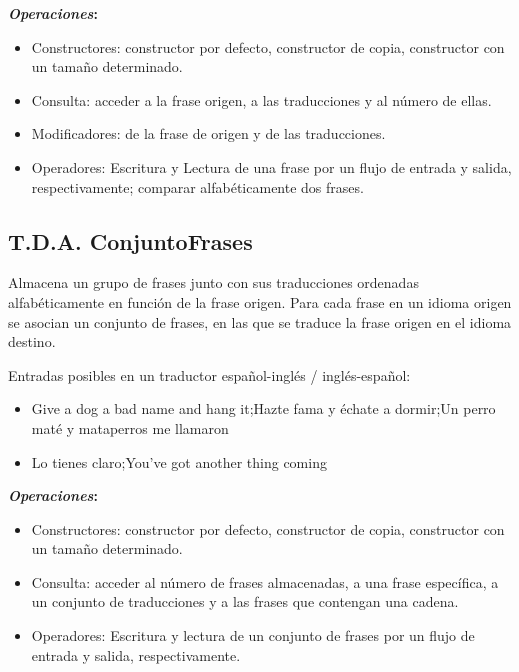 \textbf{\textit{Operaciones}:}
\begin{itemize}
	\item Constructores: constructor por defecto, constructor de copia, constructor con un tamaño determinado.
	\item Consulta: acceder a la frase origen, a las traducciones y al número de ellas.
	\item Modificadores: de la frase de origen y de las traducciones.	
	\item Operadores: Escritura y Lectura de una frase por un flujo de entrada y salida, respectivamente; comparar alfabéticamente dos frases.
\end{itemize}

\subsection{T.D.A. ConjuntoFrases}
Almacena un grupo de frases junto con sus traducciones ordenadas alfabéticamente en función de la frase origen.
Para cada frase en un idioma origen se asocian un conjunto de frases, en las que se traduce la frase origen en el idioma destino. 

Entradas posibles en un traductor español-inglés / inglés-español:
\begin{itemize}
	\item Give a dog a bad name and hang it;Hazte fama y échate a dormir;Un perro maté y mataperros me llamaron
	\item Lo tienes claro;You’ve got another thing coming
\end{itemize}


\textbf{\textit{Operaciones}:}
\begin{itemize}
	\item Constructores: constructor por defecto, constructor de copia, constructor con un tamaño determinado.
	\item Consulta: acceder al número de frases almacenadas, a una frase específica, a un conjunto de traducciones y a las frases que contengan una cadena.	
	\item Operadores: Escritura y lectura de un conjunto de frases por un flujo de entrada y salida, respectivamente.
\end{itemize}

\newpage


